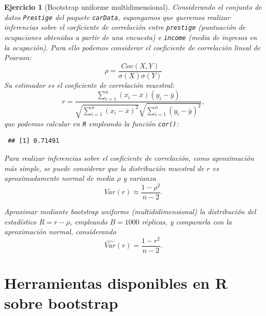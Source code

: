 \documentclass[
  10pt,
]{book}
\newenvironment{Shaded}{\begin{snugshade}}{\end{snugshade}}
\newcommand{\AttributeTok}[1]{\textcolor[rgb]{0.77,0.63,0.00}{#1}}
\newcommand{\CommentTok}[1]{\textcolor[rgb]{0.56,0.35,0.01}{\textit{#1}}}
\newcommand{\FunctionTok}[1]{\textcolor[rgb]{0.00,0.00,0.00}{#1}}
\newcommand{\NormalTok}[1]{#1}
\newcommand{\SpecialCharTok}[1]{\textcolor[rgb]{0.00,0.00,0.00}{#1}}
\newcommand{\StringTok}[1]{\textcolor[rgb]{0.31,0.60,0.02}{#1}}
\theoremstyle{break}
\newtheorem{exercise}{Ejercicio}[chapter]
\theoremstyle{nonumberplain}
\renewcommand{\CommentTok}[1]{\textcolor[rgb]{0.41,0.41,0.41}{\texttt{#1}}}
\begin{document}
\begin{exercise}[Bootstrap uniforme multidimensional]
\protect\hypertarget{exr:unif-multi}{}\label{exr:unif-multi}
Considerando el conjunto de datos \texttt{Prestige} del paquete \texttt{carData}, supongamos que queremos realizar inferencias sobre el coeficiente de correlación entre \texttt{prestige} (puntuación de ocupaciones obtenidas a partir de una encuesta) e \texttt{income} (media de ingresos en la ocupación).
Para ello podemos considerar el coeficiente de correlación lineal de Pearson:
\[\rho =\frac{ Cov \left( X, Y \right) }
{ \sigma \left( X \right) \sigma \left( Y \right) }\]
Su estimador es el coeficiente de correlación muestral:
\[r=\frac{\sum_{i=1}^{n}(x_i-\overline{x})(y_i-\overline{y})}
{\sqrt{ \sum_{i=1}^{n}(x_i-\overline{x})^{2}} 
\sqrt{\sum_{i=1}^{n}(y_i-\overline{y})^{2}}},\]
que podemos calcular en \texttt{R} empleando la función \texttt{cor()}:

\begin{Shaded}
\end{Shaded}

\begin{verbatim}
 ## [1] 0.71491
\end{verbatim}

Para realizar inferencias sobre el coeficiente de correlación, como aproximación más simple, se puede considerar que la distribución muestral de \(r\) es aproximadamente normal de media \(\rho\) y varianza
\[Var(r) \approx \frac{1 - \rho^2}{n - 2}.\]

Aproximar mediante bootstrap uniforme (multididimensional) la distribución del estadístico \(R = r -\rho\), empleando \(B=1000\) réplicas, y compararla con la aproximación normal, considerando
\[\widehat{Var}(r) = \frac{1 - r^2}{n - 2}.\]
\end{exercise}

\hypertarget{intro-paquetes}{%
\section{Herramientas disponibles en R sobre bootstrap}\label{intro-paquetes}}
\end{document}
